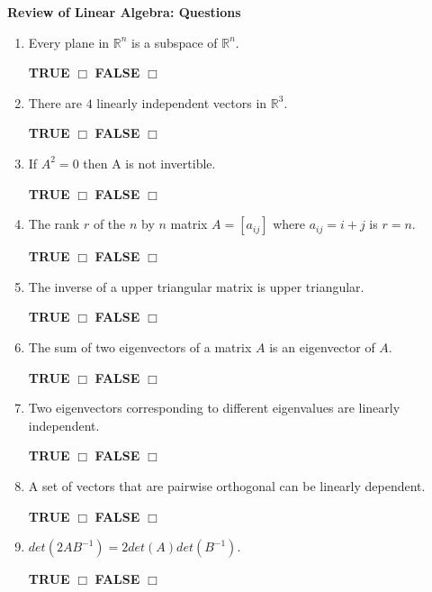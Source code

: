 \documentclass[14pt]{report}
\begin{document}
\textbf{{Review of Linear Algebra: Questions}}\\
\thispagestyle{empty}


\begin{enumerate}
\item Every plane in $\mathbb{R}^n$ is a subspace of $\mathbb{R}^n$.  

\quad \textbf{TRUE} $\Box$ \quad\textbf{FALSE} $\Box$ 

\item There are $4$ linearly independent vectors in $\mathbb{R}^3$. 

\quad \textbf{TRUE} $\Box$ \quad\textbf{FALSE} $\Box$ 

\item If $A^2=0$ then A is not invertible.

 \quad \textbf{TRUE} $\Box$ \quad\textbf{FALSE} $\Box$ 



\item The rank $r$ of the $n$ by $n$ matrix $A=[a_{ij}]$ where $a_{ij}=i+j$ is $r=n$.

 \quad \textbf{TRUE} $\Box$ \quad\textbf{FALSE} $\Box$ 

\item The inverse of a upper triangular matrix is upper triangular. 

\quad \textbf{TRUE} $\Box$ \quad\textbf{FALSE} $\Box$ 

\item The sum of two eigenvectors of a matrix $A$ is an eigenvector of $A$. 

\quad \textbf{TRUE} $\Box$ \quad\textbf{FALSE} $\Box$ 

\item Two eigenvectors corresponding to different eigenvalues  are linearly  independent.

 \quad \textbf{TRUE} $\Box$ \quad\textbf{FALSE} $\Box$ 

\item A set of vectors that are pairwise orthogonal can be
  linearly dependent. 

\quad \textbf{TRUE} $\Box$ \quad\textbf{FALSE} $\Box$ 

\item $det(2AB^{-1})=2det(A)det(B^{-1})$. 

\quad \textbf{TRUE} $\Box$ \quad\textbf{FALSE} $\Box$ 


\end{enumerate}
\end{document}
